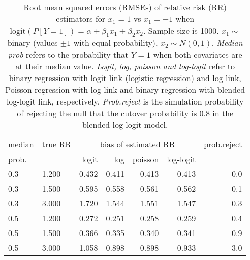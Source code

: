 \documentclass[12pt,a4paper]{article}
\begin{document}
\begin{table}[H] 
\small\sf\centering 
\caption{Root mean squared errors (RMSEs) of relative risk (RR) estimators for $x_1=1$ vs $x_1=-1$ when $\mbox{logit}(P[Y=1])=\alpha+\beta_1 x_1 + \beta_2 x_2$. Sample size is 1000. $x_1 \sim $binary (values $\pm 1$ with equal probability), $x_2 \sim N(0,1)$. {\it Median prob} refers to the probability that $Y=1$ when both covariates are at their median value. {\it Logit, log, poisson and log-logit} refer to binary regression with logit link (logistic regression) and log link, Poisson regression with log link and binary regression with blended log-logit link, respectively. {\it Prob.reject} is the simulation probability of rejecting the null that the cutover probability is $0.8$ in the blended log-logit model.} 
\begin{tabular}{llrrrrr} 
\toprule 
median & true RR & \multicolumn{4}{c}{bias of estimated RR} & prob.reject \\ 
prob. & & logit & log & poisson & log-logit  & \\ \midrule 
0.3 & 1.200 & 0.432 & 0.411 & 0.413 & 0.413 & 0.0 \\  
0.3 & 1.500 & 0.595 & 0.558 & 0.561 & 0.562 & 0.1 \\  
0.3 & 3.000 & 1.720 & 1.544 & 1.551 & 1.547 & 0.3 \\  
0.5 & 1.200 & 0.272 & 0.251 & 0.258 & 0.259 & 0.4 \\  
0.5 & 1.500 & 0.366 & 0.335 & 0.340 & 0.341 & 0.9 \\  
0.5 & 3.000 & 1.058 & 0.898 & 0.898 & 0.933 & 3.0 \\  
\bottomrule 
\end{tabular} 
\end{table} 
\end{document}
